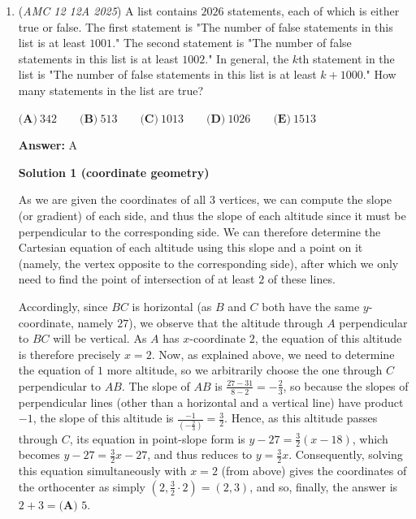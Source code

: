 \begin{enumerate}
 


	\item (\textit{AMC 12 12A 2025}) A list contains $2026$ statements, each of which is either true or false. The first statement is "The number of false statements in this list is at least $1001$." The second statement is "The number of false statements in this list is at least $1002$." In general, the $k$th statement in the list is "The number of false statements in this list is at least $k+1000$." How many statements in the list are true?


 $\textbf{(A)}\   342  \qquad                 \textbf{(B)}\   513  \qquad                 \textbf{(C)}\   1013  \qquad                 \textbf{(D)}\   1026  \qquad                 \textbf{(E)}\   1513$

 \textbf{Answer: }A



\textbf{Solution 1 (coordinate geometry)}

As we are given the coordinates of all $3$ vertices, we can compute the slope (or gradient) of each side, and thus the slope of each altitude since it must be perpendicular to the corresponding side. We can therefore determine the Cartesian equation of each altitude using this slope and a point on it (namely, the vertex opposite to the corresponding side), after which we only need to find the point of intersection of at least $2$ of these lines.

 Accordingly, since $BC$ is horizontal (as $B$ and $C$ both have the same $y$-coordinate, namely $27$), we observe that the altitude through $A$ perpendicular to $BC$ will be vertical. As $A$ has $x$-coordinate $2$, the equation of this altitude is therefore precisely $x = 2$. Now, as explained above, we need to determine the equation of $1$ more altitude, so we arbitrarily choose the one through $C$ perpendicular to $AB$. The slope of $AB$ is $\frac{27-31}{8-2} = -\frac{2}{3}$, so because the slopes of perpendicular lines (other than a horizontal and a vertical line) have product $-1$, the slope of this altitude is $\frac{-1}{\left(-\frac{2}{3}\right)} = \frac{3}{2}$. Hence, as this altitude passes through $C$, its equation in point-slope form is $y-27 = \frac{3}{2}(x-18)$, which becomes $y-27 = \frac{3}{2}x-27$, and thus reduces to $y = \frac{3}{2}x$. Consequently, solving this equation simultaneously with $x = 2$ (from above) gives the coordinates of the orthocenter as simply $\left(2,\frac{3}{2} \cdot 2\right) = (2,3)$, and so, finally, the answer is $2+3 = \boxed{\textbf{(A) }5}$.


\end{enumerate}
